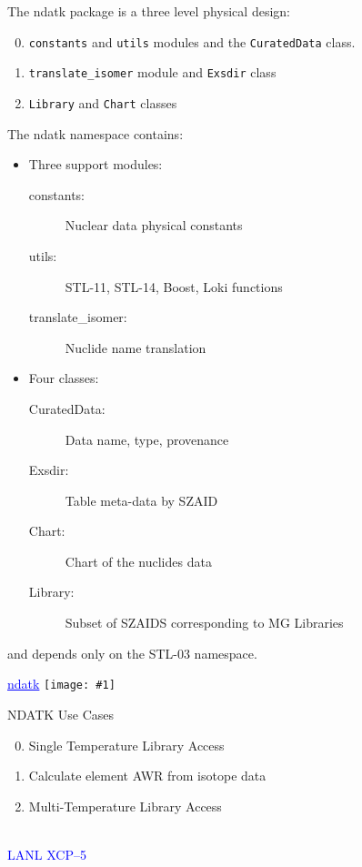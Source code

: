 \documentclass[clock]{slides}
\newenvironment{xslide}[1][logo.jpg]{\begin{slide} \tiny
\textcolor{blue}{\underline{ndatk}} \hfill
\texttt{[image: \#1]}
\normalsize}{\vfill\tiny
\textcolor{blue}{\hrulefill \\LANL XCP--5}
\end{slide}}
\begin{document}
\begin{note}\small
The ndatk package is a three level physical design:
\begin{enumerate}
\setcounter{enumi}{-1}
\item \texttt{constants} and \texttt{utils} modules and the
  \texttt{CuratedData} class.
\item \texttt{translate\_isomer} module and \texttt{Exsdir} class
\item \texttt{Library} and \texttt{Chart} classes
\end{enumerate}

The ndatk namespace contains: 
\begin{itemize}
\item Three support modules:
\begin{description}
\item[constants: ] Nuclear data physical constants
\item[utils: ] STL-11, STL-14, Boost, Loki functions
\item[translate\_isomer: ] Nuclide name translation
\end{description}
\item Four classes:
\begin{description}
\item[CuratedData: ] Data name, type, provenance
\item[Exsdir: ] Table meta-data by SZAID
\item[Chart: ] Chart of the nuclides data
\item[Library: ] Subset of SZAIDS corresponding to MG Libraries
\end{description}
\end{itemize} 
and depends only on the STL-03 namespace.
\end{note}

\begin{xslide}
\begin{center}\Large
NDATK Use Cases
\end{center}
\begin{enumerate}
\setcounter{enumi}{-1}
\item Single Temperature Library Access
\item Calculate element AWR from isotope data
\item Multi-Temperature Library Access
\end{enumerate}
\end{xslide}
\end{document}
